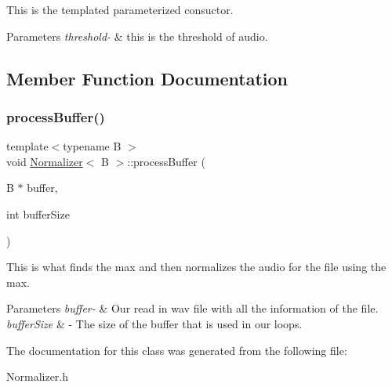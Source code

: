 This is the templated parameterized consuctor. 
\begin{DoxyParams}{Parameters}
{\em threshold-\/} & this is the threshold of audio. \\
\hline
\end{DoxyParams}


\subsection{Member Function Documentation}
\mbox{\label{classNormalizer_a30a5a6459facb09f5dc2c7c0a0c335c8}} 
\subsubsection{\texorpdfstring{process\+Buffer()}{processBuffer()}}
{\footnotesize\ttfamily template$<$typename B $>$ \\
void \hyperlink{classNormalizer}{Normalizer}$<$ B $>$\+::process\+Buffer (\begin{DoxyParamCaption}\item[{B $\ast$}]{buffer,  }\item[{int}]{buffer\+Size }\end{DoxyParamCaption})}

This is what finds the max and then normalizes the audio for the file using the max. 
\begin{DoxyParams}{Parameters}
{\em buffer-\/} & Our read in wav file with all the information of the file. \\
\hline
{\em buffer\+Size} & -\/ The size of the buffer that is used in our loops. \\
\hline
\end{DoxyParams}


The documentation for this class was generated from the following file\+:\begin{DoxyCompactItemize}
\item 
Normalizer.\+h\end{DoxyCompactItemize}
